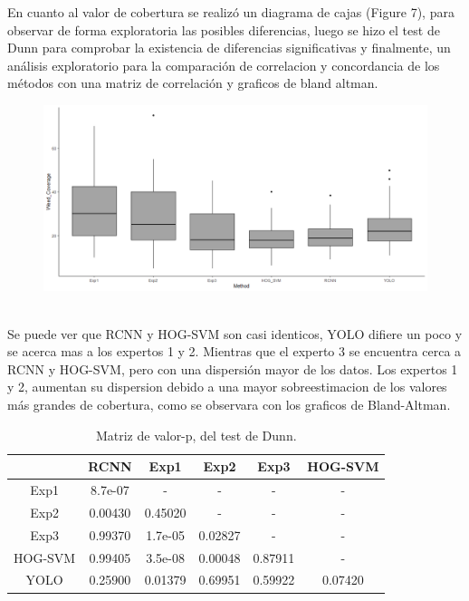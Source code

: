 \documentclass[journal,article,submit,moreauthors,pdftex]{Definitions/mdpi}
\begin{document}
En cuanto al valor de cobertura se realizó un diagrama de cajas (Figure 7), para observar de forma exploratoria las posibles diferencias, luego se hizo el test de Dunn para comprobar la existencia de  diferencias significativas y finalmente, un análisis exploratorio para la comparación de correlacion y concordancia de los métodos con una matriz de correlación y graficos de bland altman.
\\
\begin{figure}[H]
    \centering
    \includegraphics[scale=0.3]{boxplot2.png}
     \centering
    \caption{}
\end{figure}
\\
Se puede ver que RCNN y HOG-SVM son casi identicos, YOLO difiere un poco y se acerca mas a los expertos 1 y 2. Mientras que el experto 3 se encuentra cerca a RCNN y HOG-SVM, pero con una dispersión mayor de los datos. Los expertos 1 y 2, aumentan su dispersion debido a una mayor sobreestimacion de los valores más grandes de cobertura, como se observara con los graficos de Bland-Altman.
\begin{table}[H]
 \centering
 \caption{Matriz de valor-p, del test de Dunn.}
\begin{tabular}{|c|c|c|c|c|c|}
\hline
        & RCNN    & Exp1    & Exp2    & Exp3    & HOG-SVM \\ \hline
Exp1    & 8.7e-07 & -       & -       & -       & -       \\ \hline
Exp2    & 0.00430 & 0.45020 & -       & -       & -       \\ \hline
Exp3    & 0.99370 & 1.7e-05 & 0.02827 & -       & -       \\ \hline
HOG-SVM & 0.99405 & 3.5e-08 & 0.00048 & 0.87911 & -       \\ \hline
YOLO    & 0.25900 & 0.01379 & 0.69951 & 0.59922 & 0.07420 \\ \hline
\end{tabular}
\end{table}
\end{document}
